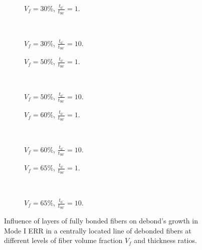 \documentclass[review]{elsarticle}
\begin{document}
\begin{figure}[!h]
\centering
    \begin{subfigure}[b]{0.45\textwidth}
        \caption{$V_{f}=30\%$, $\frac{t_{0^{\circ}}}{t_{90^{\circ}}}=1$.}\label{subfig:abovefiber30MIthick1}
    \end{subfigure} ~
    \begin{subfigure}[b]{0.45\textwidth}
         \caption{$V_{f}=30\%$, $\frac{t_{0^{\circ}}}{t_{90^{\circ}}}=10$.}\label{subfig:abovefiber30MIthick10}
    \end{subfigure}

   \begin{subfigure}[b]{0.45\textwidth}
        \caption{$V_{f}=50\%$, $\frac{t_{0^{\circ}}}{t_{90^{\circ}}}=1$.}\label{subfig:abovefiber50MIthick1}
    \end{subfigure} ~
    \begin{subfigure}[b]{0.45\textwidth}
         \caption{$V_{f}=50\%$, $\frac{t_{0^{\circ}}}{t_{90^{\circ}}}=10$.}\label{subfig:abovefiber50MIthick10}
    \end{subfigure}

    \begin{subfigure}[b]{0.45\textwidth}
        \caption{$V_{f}=60\%$, $\frac{t_{0^{\circ}}}{t_{90^{\circ}}}=1$.}\label{subfig:abovefiber60MIthick1}
    \end{subfigure} ~
    \begin{subfigure}[b]{0.45\textwidth}
        \caption{$V_{f}=60\%$, $\frac{t_{0^{\circ}}}{t_{90^{\circ}}}=10$.}\label{subfig:abovefiber60MIthick10}
    \end{subfigure}

    \begin{subfigure}[b]{0.45\textwidth}
        \caption{$V_{f}=65\%$, $\frac{t_{0^{\circ}}}{t_{90^{\circ}}}=1$.}\label{subfig:abovefiber65MIthick1}
    \end{subfigure} ~
    \begin{subfigure}[b]{0.45\textwidth}
        \caption{$V_{f}=65\%$, $\frac{t_{0^{\circ}}}{t_{90^{\circ}}}=10$.}\label{subfig:abovefiber65MIthick10}
    \end{subfigure}

\caption{Influence of layers of fully bonded fibers on debond's growth in Mode I ERR in a centrally located line of debonded fibers at different levels of fiber volume fraction $V_{f}$ and thickness ratios.}\label{fig:abovefibersMI}
\end{figure}
\end{document}
